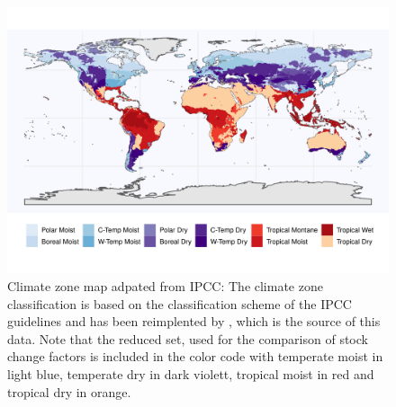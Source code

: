 \documentclass[gc, manuscript]{copernicus}
\begin{document}
\begin{figure}
\includegraphics[width=13cm]{../ResultNotebooks/Output/Images/climatezones} 
\caption{Climate zone map adpated from IPCC: The climate zone classification is based on the classification scheme of the IPCC guidelines \cite{eggleston_ipcc_2006} and has been reimplented by \cite{carre_background_2010}, which is the source of this data. Note that the reduced set, used for the comparison of stock change factors is included in the color code with temperate moist in light blue, temperate dry in dark violett, tropical moist in red and tropical dry in orange.}
\label{fig:CLIMzone}
\end{figure}
\end{document}
